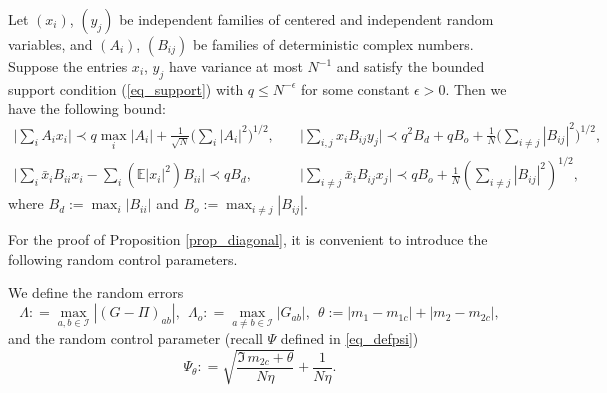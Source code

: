 \begin{lemma}\label{largederivation}
Let $(x_i)$, $(y_j)$ be independent families of centered and independent random variables, and $(A_i)$, $(B_{ij})$ be families of deterministic complex numbers. Suppose the entries $x_i$, $y_j$ have variance at most $N^{-1}$ and satisfy the bounded support condition (\ref{eq_support}) with $q\le N^{-\epsilon}$ for some constant $\epsilon>0$. Then we have the following bound:
\begin{align}
\Big\vert \sum_i A_i x_i \Big\vert \prec  q \max_{i} \vert A_i \vert+ \frac{1}{\sqrt{N}}\Big(\sum_i |A_i|^2 \Big)^{1/2} , \quad  & \Big\vert \sum_{i,j} x_i B_{ij} y_j \Big\vert \prec q^2 B_d  + qB_o + \frac{1}{N}\Big(\sum_{i\ne j} |B_{ij}|^2\Big)^{{1}/{2}} , \\
 \Big\vert \sum_{i} \bar x_i B_{ii} x_i - \sum_{i} (\mathbb E|x_i|^2) B_{ii}  \Big\vert  \prec q B_d  ,\quad & \Big\vert \sum_{i\ne j} \bar x_i B_{ij} x_j \Big\vert  \prec qB_o + \frac{1}{N}\left(\sum_{i\ne j} |B_{ij}|^2\right)^{{1}/{2}} ,
\end{align}
where $B_d:=\max_{i} |B_{ii} |$ and $B_o:= \max_{i\ne j} |B_{ij}|.$
\end{lemma}  

For the proof of Proposition \ref{prop_diagonal}, it is convenient to introduce the following random control parameters.

\begin{definition}
We define the random errors
\begin{equation}\label{eqn_randomerror}
\Lambda : = \mathop {\max }\limits_{a,b \in \mathcal I} \left| {\left( {G - \Pi } \right)_{ab} } \right|,\ \ \Lambda _o : = \mathop {\max }\limits_{a \ne b \in \mathcal I} \left| {G_{ab} } \right|, \ \ \theta:= |m_1-m_{1c}| +  |m_2-m_{2c}| ,
\end{equation}
and the random control parameter (recall $\Psi$ defined in \eqref{eq_defpsi})
\begin{equation}\label{eq_defpsitheta}
\Psi _\theta  : = \sqrt {\frac{{\Im \, m_{2c}  + \theta }}{{N\eta }}} + \frac{1}{N\eta}.
\end{equation}
\end{definition}

